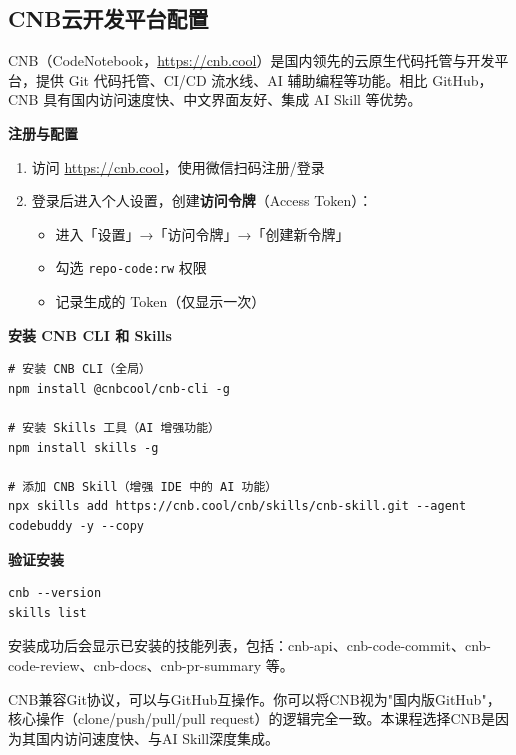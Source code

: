 \subsection{CNB云开发平台配置}

CNB（CodeNotebook，\url{https://cnb.cool}）是国内领先的云原生代码托管与开发平台，提供 Git 代码托管、CI/CD 流水线、AI 辅助编程等功能。相比 GitHub，CNB 具有国内访问速度快、中文界面友好、集成 AI Skill 等优势。

\textbf{注册与配置}

\begin{enumerate}[leftmargin=2em]
  \item 访问 \url{https://cnb.cool}，使用微信扫码注册/登录
  \item 登录后进入个人设置，创建\textbf{访问令牌}（Access Token）：
    \begin{itemize}
      \item 进入「设置」→「访问令牌」→「创建新令牌」
      \item 勾选 \texttt{repo-code:rw} 权限
      \item 记录生成的 Token（仅显示一次）
    \end{itemize}
\end{enumerate}

\textbf{安装 CNB CLI 和 Skills}

\begin{lstlisting}[style=shell]
# 安装 CNB CLI（全局）
npm install @cnbcool/cnb-cli -g

# 安装 Skills 工具（AI 增强功能）
npm install skills -g

# 添加 CNB Skill（增强 IDE 中的 AI 功能）
npx skills add https://cnb.cool/cnb/skills/cnb-skill.git --agent codebuddy -y --copy
\end{lstlisting}

\textbf{验证安装}

\begin{lstlisting}[style=shell]
cnb --version
skills list
\end{lstlisting}

安装成功后会显示已安装的技能列表，包括：cnb-api、cnb-code-commit、cnb-code-review、cnb-docs、cnb-pr-summary 等。

\begin{notebox}[CNB与GitHub的关系]
CNB兼容Git协议，可以与GitHub互操作。你可以将CNB视为"国内版GitHub"，核心操作（clone/push/pull/pull request）的逻辑完全一致。本课程选择CNB是因为其国内访问速度快、与AI Skill深度集成。
\end{notebox}

